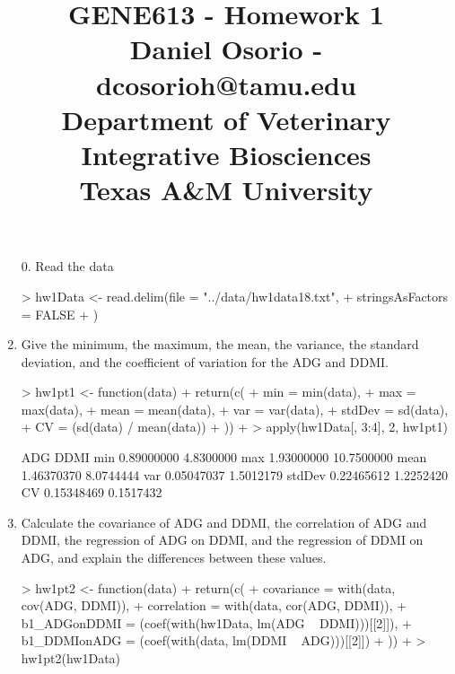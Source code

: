 \documentclass[12pt,a4paper]{paper}
\begin{document}
\title{GENE613 - Homework 1\\\small{Daniel Osorio - dcosorioh@tamu.edu\\Department of Veterinary Integrative Biosciences\\Texas A\&M University}}
\maketitle

\begin{enumerate}
\item[0.] Read the data 
\begin{Schunk}
\begin{Sinput}
> hw1Data <- read.delim(file = "../data/hw1data18.txt",
+                       stringsAsFactors = FALSE
+                       )
\end{Sinput}
\end{Schunk}
\item Give the minimum, the maximum, the mean, the variance, the standard deviation, and the coefficient of variation for the ADG and DDMI.
\begin{Schunk}
\begin{Sinput}
> hw1pt1 <- function(data) {
+   return(c(
+     min = min(data),
+     max = max(data),
+     mean = mean(data),
+     var = var(data),
+     stdDev = sd(data),
+     CV = (sd(data) / mean(data))
+   ))
+ }
> apply(hw1Data[, 3:4], 2, hw1pt1)
\end{Sinput}
\begin{Soutput}
              ADG       DDMI
min    0.89000000  4.8300000
max    1.93000000 10.7500000
mean   1.46370370  8.0744444
var    0.05047037  1.5012179
stdDev 0.22465612  1.2252420
CV     0.15348469  0.1517432
\end{Soutput}
\end{Schunk}
\item Calculate the covariance of ADG and DDMI, the correlation of ADG and DDMI, the regression of ADG on DDMI, and the regression of DDMI on ADG, and explain the differences between these values.
\begin{Schunk}
\begin{Sinput}
> hw1pt2 <- function(data) {
+   return(c(
+     covariance = with(data, cov(ADG, DDMI)),
+     correlation = with(data, cor(ADG, DDMI)),
+     b1_ADGonDDMI = (coef(with(hw1Data, lm(ADG ~ DDMI)))[[2]]),
+     b1_DDMIonADG = (coef(with(data, lm(DDMI ~ ADG)))[[2]])
+   ))
+ }
> hw1pt2(hw1Data)
\end{Sinput}
\begin{Soutput}

\end{Soutput}
\end{Schunk}
\end{enumerate}
\end{document}
